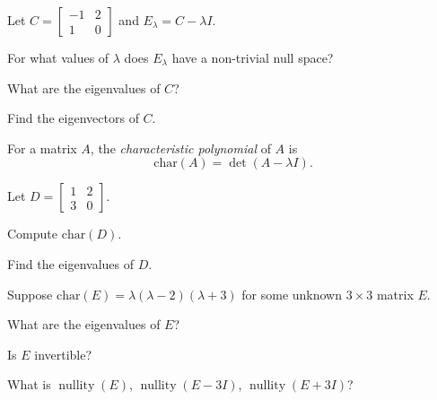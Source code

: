 \documentclass[14pt]{problemset}
\newcommand{\nnul}{\operatorname{nullity}}
\newcommand{\mat}[1]{\begin{bmatrix}#1\end{bmatrix}}
\newcommand{\chr}{\mathrm{char}}
\begin{document}
	\vspace{-.2cm}
	\question
	Let $C=\mat{-1&2\\1&0}$ and $E_\lambda = C-\lambda I$.
	\begin{parts}
		\item For what values of $\lambda$ does $E_\lambda$ have a non-trivial
			null space?
		\item What are the eigenvalues of $C$?
		\item Find the eigenvectors of $C$.
	\end{parts}
	
	\newpage
	\begin{definition}
	For a matrix $A$, the \emph{characteristic polynomial} of $A$ is
	\[
		\chr(A)=\det(A-\lambda I).
	\]
	\end{definition}
	\vspace{-.4cm}
	
	\question
	Let $D=\mat{1&2\\3&0}$.
	\begin{parts}
		\item Compute $\chr(D)$.
		\item Find the eigenvalues of $D$.
	\end{parts}

	\vspace{-.3cm}
	\question
	\vspace{-.2cm}
	Suppose $\chr(E)=\lambda(\lambda -2)(\lambda +3)$ for some unknown $3\times 3$
	matrix $E$.
	\begin{parts}
		\item What are the eigenvalues of $E$?
		\item Is $E$ invertible?
		\item What is $\nnul(E)$, $\nnul(E-3I)$, $\nnul(E+3I)$?
	\end{parts}
\end{document}
